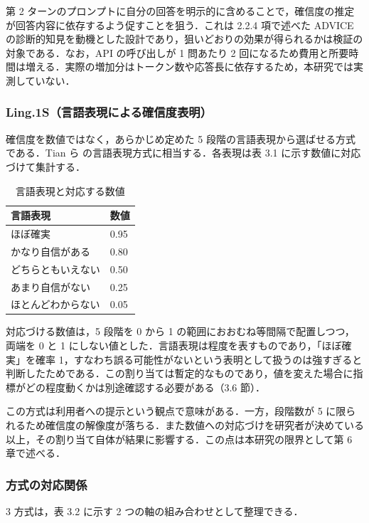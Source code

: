 第 2 ターンのプロンプトに自分の回答を明示的に含めることで，確信度の推定が回答内容に依存するよう促すことを狙う．これは 2.2.4 項で述べた ADVICE の診断的知見を動機とした設計であり，狙いどおりの効果が得られるかは検証の対象である．なお，API の呼び出しが 1 問あたり 2 回になるため費用と所要時間は増える．実際の増加分はトークン数や応答長に依存するため，本研究では実測していない．

\subsubsection{Ling.1S（言語表現による確信度表明）}

確信度を数値ではなく，あらかじめ定めた 5 段階の言語表現から選ばせる方式である．Tian ら \cite{tian2023justask} の言語表現方式に相当する．各表現は表 3.1 に示す数値に対応づけて集計する．

\begin{table}[htbp]
\centering
\small
\caption{言語表現と対応する数値}
\label{tab:3.1}
\begin{tabular}{|l|l|}
\hline
言語表現 & 数値 \\
\hline
ほぼ確実 & 0.95 \\
かなり自信がある & 0.80 \\
どちらともいえない & 0.50 \\
あまり自信がない & 0.25 \\
ほとんどわからない & 0.05 \\
\hline
\end{tabular}
\end{table}

対応づける数値は，5 段階を 0 から 1 の範囲におおむね等間隔で配置しつつ，両端を 0 と 1 にしない値とした．言語表現は程度を表すものであり，「ほぼ確実」を確率 1，すなわち誤る可能性がないという表明として扱うのは強すぎると判断したためである．この割り当ては暫定的なものであり，値を変えた場合に指標がどの程度動くかは別途確認する必要がある（3.6 節）．

この方式は利用者への提示という観点で意味がある．一方，段階数が 5 に限られるため確信度の解像度が落ちる．また数値への対応づけを研究者が決めている以上，その割り当て自体が結果に影響する．この点は本研究の限界として第 6 章で述べる．

\subsubsection{方式の対応関係}

3 方式は，表 3.2 に示す 2 つの軸の組み合わせとして整理できる．

